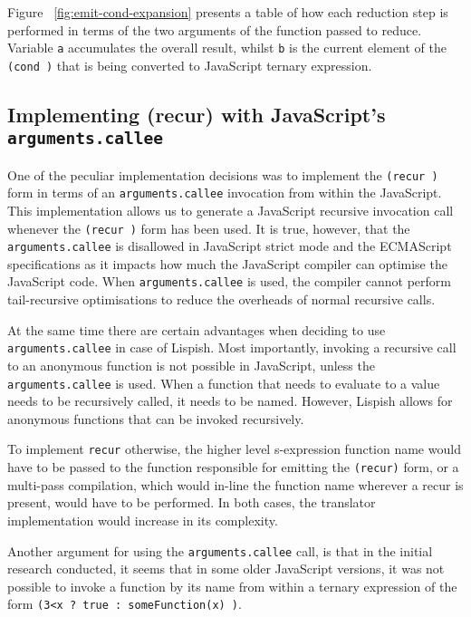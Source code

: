 

Figure ~\ref{fig:emit-cond-expansion} presents a table of how each reduction step is performed in terms of the two arguments of the function passed to reduce. Variable \texttt{a} accumulates the overall result, whilst \texttt{b} is the current element of the \texttt{(cond )} that is being converted to JavaScript ternary expression.

\subsection{Implementing (recur) with JavaScript's \texttt{arguments.callee}}
One of the peculiar implementation decisions was to implement the \texttt{(recur )} form in terms of an \texttt{arguments.callee} invocation from within the JavaScript. 
This implementation allows us to generate a JavaScript recursive invocation call whenever the \texttt{(recur )} form has been used. 
It is true, however, that the \texttt{arguments.callee} is disallowed in JavaScript strict mode and the ECMAScript specifications as it impacts how much the JavaScript compiler can optimise the JavaScript code. When \texttt{arguments.callee} is used, the compiler cannot perform tail-recursive optimisations to reduce the overheads of normal recursive calls.  

At the same time there are certain advantages when deciding to use \texttt{arguments.callee} in case of Lispish. 
Most importantly, invoking a recursive call to an anonymous function is not possible in JavaScript, unless the \texttt{arguments.callee} is used. When a function that needs to evaluate to a value needs to be recursively called, it needs to be named. However, Lispish allows for anonymous functions that can be invoked recursively.

To implement \texttt{recur} otherwise, the higher level s-expression function name would have to be passed to the function responsible for emitting the \texttt{(recur)} form, or a multi-pass compilation, which would in-line the function name wherever a recur is present, would have to be performed. In both cases, the translator implementation would increase in its complexity.

Another argument for using the \texttt{arguments.callee} call, is that in the initial research conducted, it seems that in some older JavaScript versions, it was not possible to invoke a function by its name from within a ternary expression of the form \texttt{(3<x ? true : someFunction(x) )}. 

